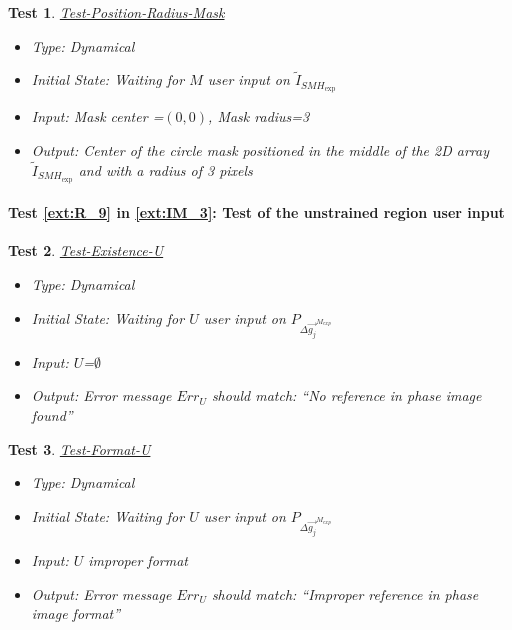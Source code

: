 \documentclass[12pt, titlepage]{article}
\newtheorem{Test}{Test}
\begin{document}
\begin{Test}\normalfont\underline{Test-Position-Radius-Mask}
\begin{itemize}
\item Type: Dynamical
\item Initial State: Waiting for $M$ user input on $\widetilde{I}_{\mathit{SMH}_{\text{exp}}}$
\item Input: Mask center =$(0,0)$, Mask radius=3
\item Output: Center of the circle mask positioned in the middle of the 2D array $\widetilde{I}_{\mathit{SMH}_{\text{exp}}}$ and with a radius of 3 pixels
\end{itemize}
\end{Test}


\paragraph{Test \cref{ext:R_9} in \cref{ext:IM_3}: Test of the unstrained region user input}

\begin{Test}\normalfont\underline{Test-Existence-U}
\begin{itemize}
\item Type: Dynamical
\item Initial State: Waiting for $U$ user input on $P_{\Delta \overrightarrow{g_{j}}^{M_{exp}}}$
\item Input: $U$=$\emptyset$
\item Output:  Error message $Err_{U}$ should match: \enquote{No reference in phase image found}
\end{itemize}
\end{Test}

\begin{Test}\normalfont\underline{Test-Format-U}
\begin{itemize}
\item Type: Dynamical
\item Initial State: Waiting for $U$ user input on $P_{\Delta \overrightarrow{g_{j}}^{M_{exp}}}$
\item Input: $U$ improper format
\item Output:  Error message $Err_{U}$ should match: \enquote{Improper reference in phase image format}
\end{itemize}
\end{Test}
\end{document}
